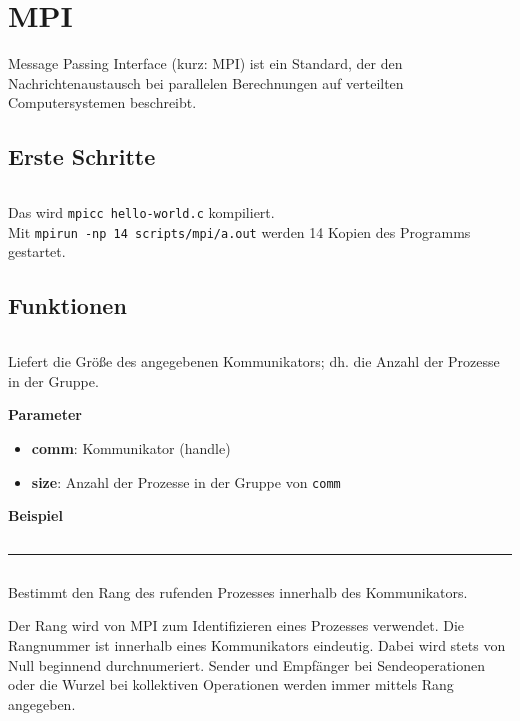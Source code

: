 \chapter{MPI}

Message Passing Interface (kurz: MPI) ist ein Standard, 
der den Nachrichtenaustausch bei parallelen Berechnungen auf 
verteilten Computersystemen beschreibt.

\section{Erste Schritte}
\inputminted[numbersep=5pt, tabsize=4, frame=lines, label=hello-world.c]{c}{scripts/mpi/hello-world.c}

Das wird \texttt{mpicc hello-world.c} kompiliert.\\
Mit \texttt{mpirun -np 14 scripts/mpi/a.out} werden 14 Kopien des Programms
gestartet.

\section{Funktionen}
\inputminted[numbersep=5pt, tabsize=4]{c}{scripts/mpi/comm-size.c}
Liefert die Größe des angegebenen Kommunikators; dh. die Anzahl der Prozesse in der Gruppe.

\textbf{Parameter}
\begin{itemize}
    \item \textbf{comm}: Kommunikator (handle)
    \item \textbf{size}: Anzahl der Prozesse in der Gruppe von \texttt{comm}
\end{itemize}

\textbf{Beispiel}
\inputminted[numbersep=5pt, tabsize=4]{c}{scripts/mpi/comm-size-example.c}
\rule{\textwidth}{0.4pt}
\inputminted[numbersep=5pt, tabsize=4]{c}{scripts/mpi/comm-rank.c}
Bestimmt den Rang des rufenden Prozesses innerhalb des Kommunikators.

Der Rang wird von MPI zum Identifizieren eines Prozesses verwendet. Die Rangnummer ist innerhalb eines Kommunikators eindeutig. Dabei wird stets von Null beginnend durchnumeriert. Sender und Empfänger bei Sendeoperationen oder die Wurzel bei kollektiven Operationen werden immer mittels Rang angegeben.

